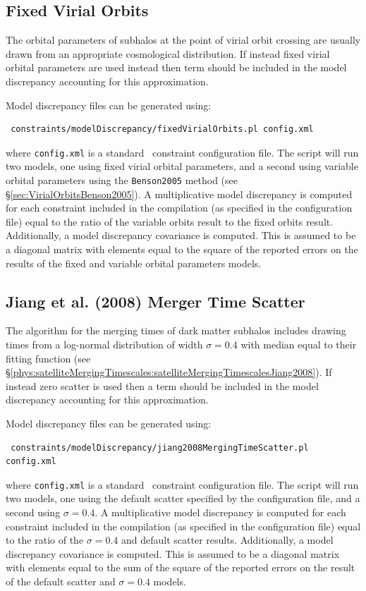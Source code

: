 \subsection{Fixed Virial Orbits}

The orbital parameters of subhalos at the point of virial orbit crossing are usually drawn from an appropriate cosmological distribution. If instead fixed virial orbital parameters are used instead then term should be included in the model discrepancy accounting for this approximation. 

Model discrepancy files can be generated using:
\begin{verbatim}
 constraints/modelDiscrepancy/fixedVirialOrbits.pl config.xml
\end{verbatim}
where {\tt config.xml} is a standard \glc\ constraint configuration file. The script will run two models, one using fixed virial orbital parameters, and a second using variable orbital parameters using the {\tt Benson2005} method (see \S\ref{sec:VirialOrbitsBenson2005}). A multiplicative model discrepancy is computed for each constraint included in the compilation (as specified in the configuration file) equal to the ratio of the variable orbits result to the fixed orbits result. Additionally, a model discrepancy covariance is computed. This is assumed to be a diagonal matrix with elements equal to the square of the reported errors on the results of the fixed and variable orbital parameters models.

\subsection{Jiang et al. (2008) Merger Time Scatter}

The \cite{jiang_fitting_2008} algorithm for the merging times of dark matter subhalos includes drawing times from a log-normal distribution of width $\sigma=0.4$ with median equal to their fitting function (see \S\ref{phys:satelliteMergingTimescales:satelliteMergingTimescalesJiang2008}). If instead zero scatter is used then a term should be included in the model discrepancy accounting for this approximation. 

Model discrepancy files can be generated using:
\begin{verbatim}
 constraints/modelDiscrepancy/jiang2008MergingTimeScatter.pl config.xml
\end{verbatim}
where {\tt config.xml} is a standard \glc\ constraint configuration file. The script will run two models, one using the default scatter specified by the configuration file, and a second using $\sigma=0.4$. A multiplicative model discrepancy is computed for each constraint included in the compilation (as specified in the configuration file) equal to the ratio of the $\sigma=0.4$ and default scatter results. Additionally, a model discrepancy covariance is computed. This is assumed to be a diagonal matrix with elements equal to the sum of the square of the reported errors on the result of the default scatter and $\sigma=0.4$ models.

